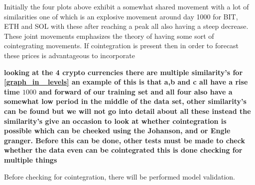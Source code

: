 Initially the four plots above exhibit a somewhat shared movement with a lot of similarities one of which is an explosive movement around day 1000 for BIT, ETH and SOL with these after reaching a peak all also having a steep decrease. These joint movements emphasizes the theory of having some sort of cointegrating movements. If cointegration is present then in order to forecast these prices is advantageous to incorporate 

\noindent \textbf{looking at the 4 crypto currencies there are multiple similarity's for \ref{graph_in _levels} an example of this is that a,b and c all have a rise time $1000$ and forward of our training set and all four also have a somewhat low period in the middle of the data set, other similarity's can be found but we will not go into detail about all these instead the similarity's give an occasion to look at whether cointegration is possible which can be cheeked using the Johanson, and or Engle granger. Before this can be done, other tests must be made to check whether the data even can be cointegrated this is done checking for multiple things}



Before checking for cointegration, there will be performed model validation.


